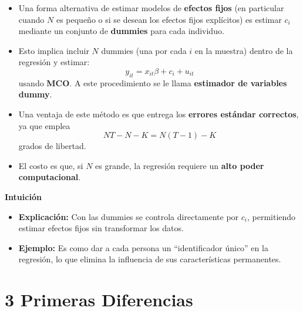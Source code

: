 \documentclass[12pt]{article}
\begin{document}
\begin{itemize}
    \item Una forma alternativa de estimar modelos de \textbf{efectos fijos} (en particular cuando $N$ es pequeño o si se desean los efectos fijos explícitos) es estimar $c_i$ mediante un conjunto de \textbf{dummies} para cada individuo.
    
    \item Esto implica incluir $N$ dummies (una por cada $i$ en la muestra) dentro de la regresión y estimar:
    \[
    y_{it} = x_{it}\beta + c_i + u_{it} \tag{3}
    \]
    usando \textbf{MCO}. A este procedimiento se le llama \textbf{estimador de variables dummy}.
    
    \item Una ventaja de este método es que entrega los \textbf{errores estándar correctos}, ya que emplea 
    \[
    NT - N - K = N(T-1) - K
    \]
    grados de libertad.
    
    \item El costo es que, si $N$ es grande, la regresión requiere un \textbf{alto poder computacional}.
\end{itemize}

\noindent\textbf{Intuición}
\begin{itemize}
    \item \textbf{Explicación:} Con las dummies se controla directamente por $c_i$, permitiendo estimar efectos fijos sin transformar los datos.
    \item \textbf{Ejemplo:} Es como dar a cada persona un “identificador único” en la regresión, lo que elimina la influencia de sus características permanentes.
\end{itemize}

\section*{\noindent\textbf{3 Primeras Diferencias}}
\end{document}
